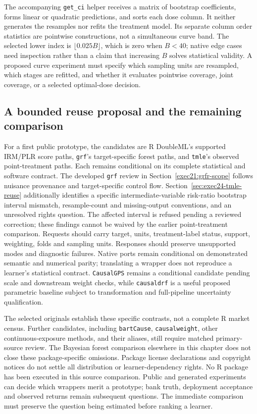 The accompanying \texttt{get\_ci} helper receives a matrix of bootstrap
coefficients, forms linear or quadratic predictions, and sorts each dose column.
It neither generates the resamples nor refits the treatment model. Its separate
column order statistics are pointwise constructions, not a simultaneous curve
band. The selected lower index is $\lfloor0.025B\rfloor$, which is zero when
$B<40$; native edge cases need inspection rather than a claim that increasing
$B$ solves statistical validity. A proposed curve experiment must specify which
sampling units are resampled, which stages are refitted, and whether it evaluates
pointwise coverage, joint coverage, or a selected optimal-dose decision.
\citep{exec20_rfx_causaldrf,exec20_rfx_reference}

\subsection{A bounded reuse proposal and the remaining comparison}

For a first public prototype, the candidates are R DoubleML's supported
IRM/PLR score paths, \texttt{grf}'s target-specific forest paths, and
\texttt{tmle}'s observed point-treatment paths. Each remains conditional on
its complete statistical and software contract. The developed \texttt{grf}
review in Section~\ref{exec21:grfr-scope} follows nuisance provenance and
target-specific control flow. Section~\ref{sec:exec24-tmle-reuse} additionally
identifies a specific intermediate-variable risk-ratio bootstrap interval
mismatch, resample-count and missing-output conventions, and an unresolved
rights question. The affected interval is refused pending a reviewed correction;
these findings cannot be waived by the earlier point-treatment comparison.
Requests should carry target, units, treatment-label status, support, weighting,
folds and sampling units. Responses should preserve unsupported modes and
diagnostic failures. Native ports remain conditional on demonstrated semantic
and numerical parity; translating a wrapper does not reproduce a learner's
statistical contract.
\texttt{CausalGPS} remains a conditional candidate pending scale and downstream
weight checks, while \texttt{causaldrf} is a useful proposed parametric baseline
subject to transformation and full-pipeline uncertainty qualification.

The selected originals establish these specific contrasts, not a complete R
market census. Further candidates, including \texttt{bartCause},
\texttt{causalweight}, other continuous-exposure methods, and their aliases,
still require matched primary-source review. The Bayesian forest comparison
elsewhere in this chapter does not close these package-specific omissions. Package license declarations and
copyright notices do not settle all distribution or learner-dependency rights.
No R package has been executed in this source comparison. Public and generated
experiments can decide which wrappers merit a prototype; bank truth, deployment
acceptance and observed returns remain subsequent questions. The immediate
comparison must preserve the question being estimated before ranking a learner.


